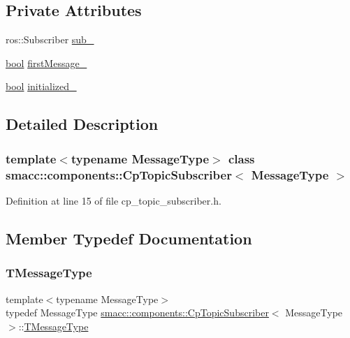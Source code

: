 \subsection*{Private Attributes}
\begin{DoxyCompactItemize}
\item 
ros\+::\+Subscriber \hyperlink{classsmacc_1_1components_1_1CpTopicSubscriber_a87f9c87f6b7c0801dff4fcc7519dbe0e}{sub\+\_\+}
\item 
\hyperlink{classbool}{bool} \hyperlink{classsmacc_1_1components_1_1CpTopicSubscriber_aadbaf8c0f0a2a5bea38f41356528f41c}{first\+Message\+\_\+}
\item 
\hyperlink{classbool}{bool} \hyperlink{classsmacc_1_1components_1_1CpTopicSubscriber_a666e60629820ef146ade691a36c41e0a}{initialized\+\_\+}
\end{DoxyCompactItemize}


\subsection{Detailed Description}
\subsubsection*{template$<$typename Message\+Type$>$\newline
class smacc\+::components\+::\+Cp\+Topic\+Subscriber$<$ Message\+Type $>$}



Definition at line 15 of file cp\+\_\+topic\+\_\+subscriber.\+h.



\subsection{Member Typedef Documentation}
\mbox{\label{classsmacc_1_1components_1_1CpTopicSubscriber_acdc1cefead832fd249b0fceb2c3b28b0}} 
\subsubsection{\texorpdfstring{T\+Message\+Type}{TMessageType}}
{\footnotesize\ttfamily template$<$typename Message\+Type$>$ \\
typedef Message\+Type \hyperlink{classsmacc_1_1components_1_1CpTopicSubscriber}{smacc\+::components\+::\+Cp\+Topic\+Subscriber}$<$ Message\+Type $>$\+::\hyperlink{classsmacc_1_1components_1_1CpTopicSubscriber_acdc1cefead832fd249b0fceb2c3b28b0}{T\+Message\+Type}}



